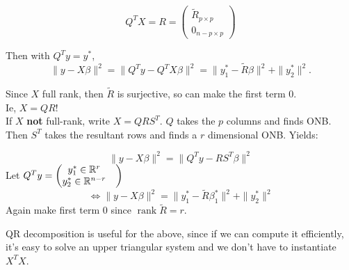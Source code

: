 \documentclass{article}
\newcommand{\rank}{\operatorname{rank}}
\begin{document}
$$Q^T X = R = \begin{pmatrix}
    \tilde R_{p\times p}\\
    0_{n-p \times p}
\end{pmatrix}$$

Then with $Q^T  y= y^*$,
$$\|y - X\beta \|^2 = \| Q^T y - Q^T X\beta \|^2  = \| y_1^* - \tilde R \beta \|^2 + \|y_2^*\|^2 .$$

Since $X$ full rank, then $\tilde R$ is surjective, so can make the first term $0$. \\
Ie, $X = QR$!\\ 
If $X$ \textbf{not} full-rank, write $X = QRS^T$. $Q$ takes the $p$ columns and finds ONB. Then $S^T$ takes the resultant rows and finds a $r$ dimensional ONB. Yields:

$$\|y-X\beta \|^2 = \| Q^T y - RS^T \beta\|^2 $$
Let $Q^T y = \begin{pmatrix}
    y_1^*\in \mathbb R^{r}&\\
    y_2^* \in \mathbb R^{n-r}
\end{pmatrix}$
$$\iff \|y-X\beta\|^2 = \|y_1^* - \tilde R \beta_1^*\|^2 + \|y_2^*\|^2 $$
Again make first term $0$ since $\rank \tilde R = r$.
\begin{fact}[Why QR?]
    QR decomposition is useful for the above, since if we can compute it efficiently, it's easy to solve an upper triangular system and we don't have to instantiate $X^T X$. 
\end{fact}
\end{document}
